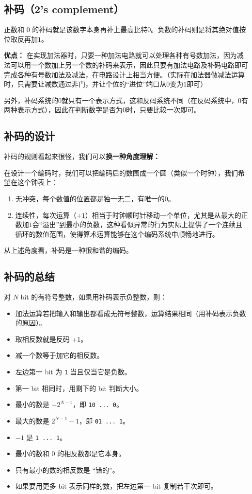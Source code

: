 \subsection{补码（2's complement）}

正数和 $0$ 的补码就是该数字本身再补上最高比特$0$。负数的补码则是将其绝对值按位取反再加$1$。

\textbf{优点：}
在实现加法器时，只要一种加法电路就可以处理各种有号数加法，因为减法可以用一个数加上另一个数的补码来表示，因此只要有加法电路及补码电路即可完成各种有号数加法及减法，在电路设计上相当方便。（实际在加法器做减法运算时，只需要让减数通过非门，并让个位的“进位”端口从$0$变为$1$即可）

另外，补码系统的$0$就只有一个表示方式，这和反码系统不同（在反码系统中，$0$有两种表示方式），因此在判断数字是否为$0$时，只要比较一次即可。


\subsection{补码的设计}

补码的规则看起来很怪，我们可以\textbf{换一种角度理解：}

在设计一个编码时，我们可以把编码后的数围成一个圆（类似一个时钟），我们希望在这个钟表上：
\begin{enumerate}
\item 
无冲突，每个数值的位置都是独一无二，有唯一的$0$。
\item 
连续性，每次运算（$+1$）相当于时钟顺时针移动一个单位，尤其是从最大的正数加$1$会“溢出”到最小的负数，这种看似异常的行为实际上提供了一个连续且循环的数值范围，使得算术运算能够在这个编码系统中顺畅地进行。
\end{enumerate}

从上述角度看，补码是一种很和谐的编码。


\subsection{补码的总结}
对 $N$ bit 的有符号整数，如果用补码表示负整数，则：
\begin{itemize}
\item 加法运算若把输入和输出都看成无符号整数，运算结果相同（用补码表示负数的原因）。
\item 取相反数就是反码 +1。
\item 减一个数等于加它的相反数。
\item 左边第一 bit 为 \verb`1` 当且仅当它是负数。
\item 第一 bit 相同时，用剩下的 bit 判断大小。
\item 最小的数是 $-2^{N-1}$，即 \verb`10 ... 0`。
\item 最大的数是 $2^{N-1}-1$，即 \verb`01 ... 1`。
\item $-1$ 是 \verb`1 ... 1`。
\item 最小的数和 $0$ 的相反数都是它本身。
\item 只有最小的数的相反数是 “错的”。
\item 如果要用更多 bit 表示同样的数，把左边第一 bit 复制若干次即可。
\end{itemize}

